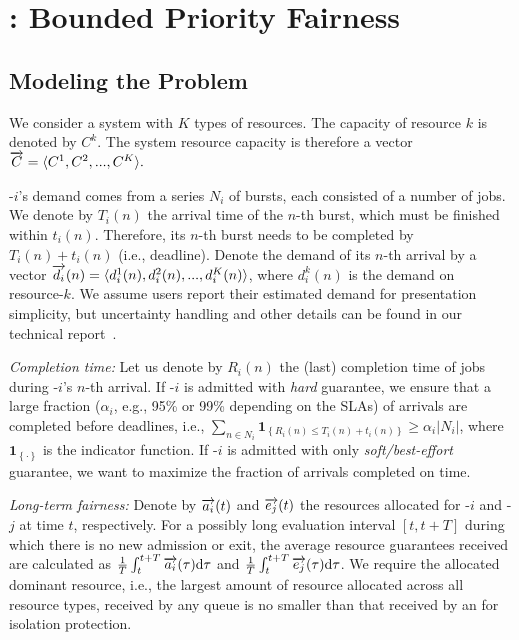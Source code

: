 \section{\name: Bounded Priority Fairness}
\label{sec:impl}


\subsection{Modeling the Problem}\label{sec:settings}
We consider a system with $K$ types of resources. The capacity of resource $k$ is denoted by $C^k$. The system resource capacity is therefore a vector $\protect\overrightarrow{C} = \langle C^1, C^2, ..., C^K \rangle.$

{\burstq}-$i$'s demand comes from a series $N_i$ of bursts, each consisted of a number of jobs. We denote by $T_i(n)$ the arrival time of the $n$-th burst, which must be finished within $t_i(n)$. Therefore, its $n$-th burst needs to be completed by $T_i(n)+t_i(n)$ (i.e., deadline).
Denote the demand of its $n$-th arrival by a vector $\protect\overrightarrow{d_i}(n)=\langle d^1_i(n), d^2_i(n), ..., d^K_i(n)\rangle$, where $d^k_i(n)$ is the demand on resource-$k$.
We assume users report their estimated demand for presentation simplicity, but uncertainty handling and other details can be found in our technical report~\cite{tech_report}. 



\emph{Completion time:}
Let us denote by $R_i(n)$ the (last) completion time of jobs during {\burstq}-$i$'s $n$-th arrival. If {\burstq}-$i$ is admitted with \emph{hard} guarantee, we ensure that a large fraction ($\alpha_i$, e.g., 95\% or 99\% depending on the SLAs) of arrivals are completed before deadlines, i.e., $\sum_{n\in N_i}\mathbf{1}_{\left\{R_i(n)\leq T_i(n)+t_i(n)\right\}} \geq \alpha_i|N_i|$, where $\mathbf{1}_{\left\{\cdot\right\}}$ is the indicator function.%
If {\burstq}-$i$ is admitted with only \emph{soft/best-effort} guarantee, we want to maximize the fraction of arrivals completed on time.

\emph{Long-term fairness:}
Denote by $\protect\overrightarrow{a_i}(t)$ and $\protect\overrightarrow{e_j}(t)$ the resources allocated for {\burstq}-$i$ and {\batchq}-$j$ at time $t$, respectively.
For a possibly long evaluation interval $[t, t+T]$ during which there is no new admission or exit, the average resource guarantees received are calculated as $\frac{1}{T}\int_t^{t+T} \protect\overrightarrow{a_i}(\tau)\text{d}\tau$ and $\frac{1}{T}\int_t^{t+T} \protect\overrightarrow{e_j}(\tau)\text{d}\tau$.
We require the allocated dominant resource, i.e., the largest amount of resource allocated across all resource types, received by any {\batchq} queue is no smaller than that received by an {\burstq} for isolation protection. %

